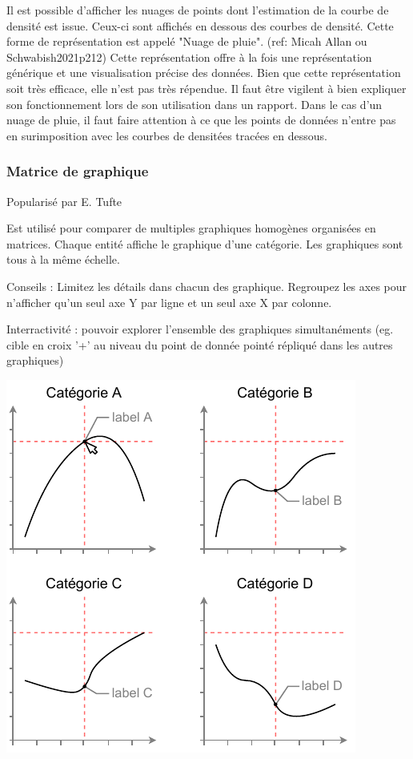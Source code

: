 \documentclass[a4paper,12pt]{article}
\begin{document}
\begin{multicols}{2}
Il est possible d'afficher les nuages de points dont l'estimation de la courbe de densité est issue. Ceux-ci sont affichés en dessous des courbes de densité. Cette forme de représentation est appelé "Nuage de pluie". (ref: Micah Allan ou Schwabish2021p212) Cette représentation offre à la fois une représentation générique et une visualisation précise des données. \autocite{jonathanschwabishDistribution2021} Bien que cette représentation soit très efficace, elle n'est pas très répendue. \autocite{jonathanschwabishDistribution2021} Il faut être vigilent à bien expliquer son fonctionnement lors de son utilisation dans un rapport. Dans le cas d'un nuage de pluie, il faut faire attention à ce que les points de données n'entre pas en surimposition avec les courbes de densitées tracées en dessous.
\subsubsection{Matrice de graphique}
\label{sec:org7407867}
Popularisé par E. Tufte

Est utilisé pour comparer de multiples graphiques homogènes organisées en matrices. Chaque entité affiche le graphique d'une catégorie. Les graphiques sont tous à la même échelle. \autocite{sosulskiGraphics2019}

Conseils : Limitez les détails dans chacun des graphique. \autocite{sosulskiGraphics2019} Regroupez les axes pour n'afficher qu'un seul axe Y par ligne et un seul axe X par colonne.

Interractivité : pouvoir explorer l'ensemble des graphiques simultanéments (eg. cible en croix '+' au niveau du point de donnée pointé répliqué dans les autres graphiques)

\begin{center}
\includegraphics[width=.9\linewidth]{./img/small-multiple.pdf}
\end{center}

\end{multicols}
\end{document}
